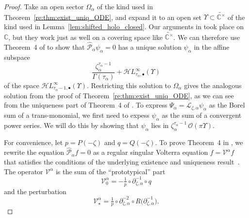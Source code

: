 \documentclass{article}
\newcommand{\singexp}[2]{\mathcal{H}L^\infty_{#1, #2}}
\newcommand{\singexpalg}[1]{\singexp{#1}{\bullet}}
\newcommand{\C}{\mathbb{C}}
\newcommand{\volterra}{\mathcal{V}}
\newcommand{\hardpart}{\mathcal{V}_0}
\newcommand{\softpart}{\mathcal{V}_\star}
\newcommand{\solwhole}{f}
\newcommand{\laplace}{\mathcal{L}}
\theoremstyle{definition}
\theoremstyle{plain}
\begin{document}
\begin{proof}
Take an open sector $\Omega_\alpha$ of the kind used in Theorem~\ref{re:thm:exist_uniq_ODE}, and expand it to an open set $\Upsilon \subset \widetilde{\C^\times}$ of the kind used in Lemma~\ref{lem:shifted_holo_closed}. Our arguments in \cite{reg-sing-volterra} took place on $\C$, but they work just as well on a covering space like $\widetilde{\C^\times}$. We can therefore use Theorem~4 of \cite{reg-sing-volterra} to show that $\hat{\mathcal{P}}_\alpha \psi_\alpha = 0$ has a unique solution $\psi_\alpha$ in the affine subspace 
\[ \frac{\zeta_\alpha^{\tau_\alpha-1}}{\Gamma(\tau_\alpha)} + \singexpalg{\tau_\alpha}(\Upsilon) \]
of the space $\singexpalg{\tau_\alpha-1}(\Upsilon)$. Restricting this solution to $\Omega_\alpha$ gives the analogous solution from the proof of Theorem~\ref{re:thm:exist_uniq_ODE}, as we can see from the uniqueness part of Theorem~4 of \cite{reg-sing-volterra}. To express $\Psi_\alpha = \laplace_{\zeta, \alpha} \psi_\alpha$ as the Borel sum of a trans-monomial, we first need to expess $\psi_\alpha$ as the sum of a convergent power series. We will do this by showing that $\psi_\alpha$ lies in $\zeta_\alpha^{\tau_\alpha - 1}\,\mathcal{O}(\pi \Upsilon)$.

For convenience, let $p = P(-\zeta)$ and $q = Q(-\zeta)$. To prove Theorem~4 in \cite{reg-sing-volterra}, we rewrite the equation $\hat{\mathcal{P}}_\alpha \solwhole = 0$ as a regular singular Volterra equation $\solwhole = \volterra^\alpha \solwhole$ that satisfies the conditions of the underlying existence and uniqueness result~\cite[Theorem~3]{reg-sing-volterra}. The operator $\volterra^\alpha$ is the sum of the ``prototypical'' part
\[ \hardpart^\alpha = -\tfrac{1}{p} \circ \partial^{-1}_{\zeta, \alpha} \circ q \]
and the perturbation
\[ \softpart^\alpha = \tfrac{1}{p} \circ \partial^{-2}_{\zeta, \alpha} \circ R\big(\partial^{-1}_{\zeta, \alpha}\big). \]


\end{proof}
\end{document}
